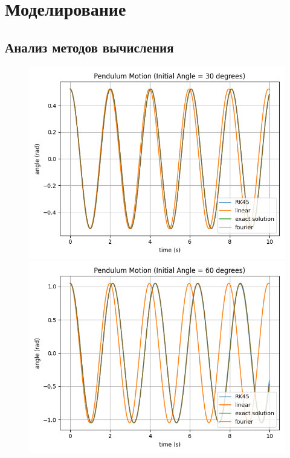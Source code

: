 \documentclass[a4paper,12pt]{article}
\begin{document}
\section{Моделирование}

\subsection{Анализ методов вычисления}

\begin{figure}[!htb]
  \includegraphics[width=\linewidth]{30.png}\label{30}
\endminipage\hfill
{}
  \includegraphics[width=\linewidth]{60.png}\label{60}
\endminipage\hfill
\end{figure}
\end{document}
